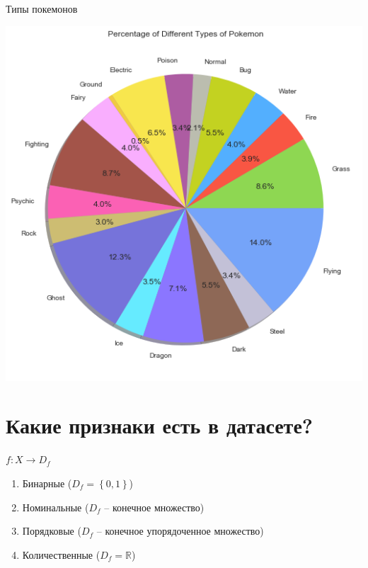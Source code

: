\documentclass[10pt]{beamer}
\begin{document}
{
\begin{frame}{Типы покемонов}
  \begin{center}
	  \includegraphics[width=\linewidth,height=0.8 \textheight,keepaspectratio]{images/pokemons_by_type}
  \end{center}
\end{frame}
}

\section{Какие признаки есть в датасете?}

\begin{frame}
	${f: X \rightarrow D_f}$
	\begin{enumerate} [-]
	  \item Бинарные (${D_f = \left\{ 0, 1 \right\} }$)
	  \item Номинальные (${D_f}$ -- конечное множество)
	  \item Порядковые (${D_f}$ -- конечное упорядоченное множество)
	  \item Количественные (${D_f = \mathbb{R} }$)
	\end{enumerate}
\end{frame}
\end{document}
